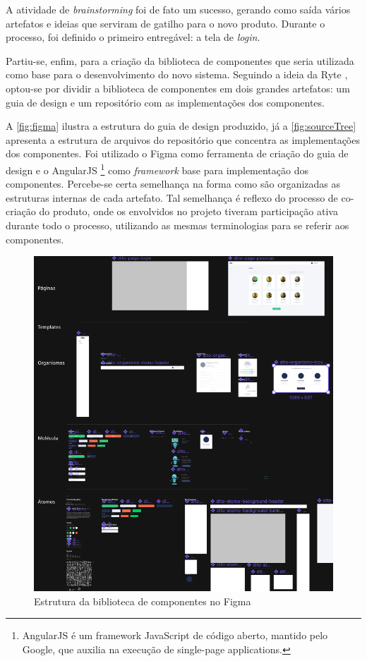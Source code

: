 A atividade de \textit{brainstorming} foi de fato um sucesso, gerando como saída vários artefatos e ideias que serviram de gatilho para o novo produto. Durante o processo, foi definido o primeiro entregável: a tela de \textit{login}.

Partiu-se, enfim, para a criação da biblioteca de componentes que seria utilizada como base para o desenvolvimento do novo sistema. Seguindo a ideia da Ryte \cite{ryteDesignSystem}, optou-se por dividir a biblioteca de componentes em dois grandes artefatos: um guia de design e um repositório com as implementações dos componentes.

A \autoref{fig:figma} ilustra a estrutura do guia de design produzido, já a \autoref{fig:sourceTree} apresenta a estrutura de arquivos do repositório que concentra as implementações dos componentes. Foi utilizado o Figma como ferramenta de criação do guia de design e o AngularJS \footnote{AngularJS é um framework JavaScript de código aberto, mantido pelo Google, que auxilia na execução de single-page applications.} como \textit{framework} base para implementação dos componentes. Percebe-se certa semelhança na forma como são organizadas as estruturas internas de cada artefato. Tal semelhança é reflexo do processo de co-criação do produto, onde os envolvidos no projeto tiveram participação ativa durante todo o processo, utilizando as mesmas terminologias para se referir aos componentes.

\begin{figure}
	\includegraphics[width=\linewidth]{./04-figuras/06_biblioteca_componentes/styleguide-figma.png}
  \caption{Estrutura da biblioteca de componentes no Figma}
  \label{fig:figma}
\end{figure}

